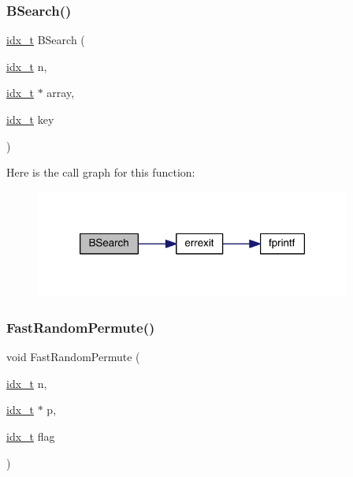 \mbox{\label{a00873_a650e5c092bae3edafdbdfd11340fe0a3}} 
\subsubsection{\texorpdfstring{B\+Search()}{BSearch()}}
{\footnotesize\ttfamily \hyperlink{a00876_aaa5262be3e700770163401acb0150f52}{idx\+\_\+t} B\+Search (\begin{DoxyParamCaption}\item[{\hyperlink{a00876_aaa5262be3e700770163401acb0150f52}{idx\+\_\+t}}]{n,  }\item[{\hyperlink{a00876_aaa5262be3e700770163401acb0150f52}{idx\+\_\+t} $\ast$}]{array,  }\item[{\hyperlink{a00876_aaa5262be3e700770163401acb0150f52}{idx\+\_\+t}}]{key }\end{DoxyParamCaption})}

Here is the call graph for this function\+:\nopagebreak
\begin{figure}[H]
\begin{center}
\leavevmode
\includegraphics[width=294pt]{a00873_a650e5c092bae3edafdbdfd11340fe0a3_cgraph}
\end{center}
\end{figure}
\mbox{\label{a00873_aad45cf489b69af118f0277011c3deb71}} 
\subsubsection{\texorpdfstring{Fast\+Random\+Permute()}{FastRandomPermute()}}
{\footnotesize\ttfamily void Fast\+Random\+Permute (\begin{DoxyParamCaption}\item[{\hyperlink{a00876_aaa5262be3e700770163401acb0150f52}{idx\+\_\+t}}]{n,  }\item[{\hyperlink{a00876_aaa5262be3e700770163401acb0150f52}{idx\+\_\+t} $\ast$}]{p,  }\item[{\hyperlink{a00876_aaa5262be3e700770163401acb0150f52}{idx\+\_\+t}}]{flag }\end{DoxyParamCaption})}


